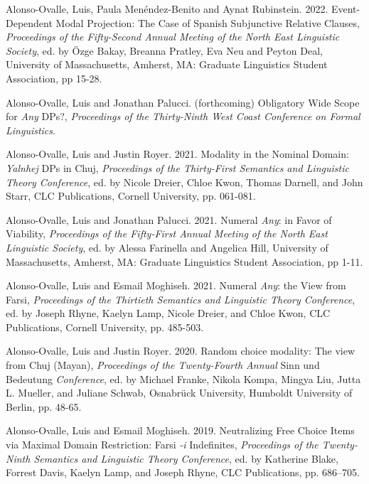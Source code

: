 \documentclass[11pt]{article}
\begin{document}
Alonso-Ovalle, Luis, Paula Men\'endez-Benito and Aynat Rubinstein. 2022. Event-Dependent Modal Projection: The Case of Spanish Subjunctive Relative Clauses, \textit{Proceedings of the Fifty-Second Annual Meeting of the North East Linguistic Society}, ed. by \"{O}zge Bakay, Breanna Pratley, Eva Neu and Peyton Deal, University of Massachusetts, Amherst, MA: Graduate Linguistics Student Association, pp 15-28.

Alonso-Ovalle, Luis and Jonathan Palucci. (forthcoming) Obligatory Wide Scope for \textit{Any} DPs?, \textit{Proceedings of the Thirty-Ninth West Coast Conference on Formal Linguistics}.

Alonso-Ovalle, Luis and Justin Royer. 2021. Modality in the Nominal Domain: \textit{Yalnhej} DPs in Chuj, \textit{Proceedings of the Thirty-First Semantics and Linguistic Theory Conference}, ed. by Nicole Dreier, Chloe Kwon, Thomas Darnell, and John Starr, CLC Publications, Cornell University, pp. 061-081.

Alonso-Ovalle, Luis and Jonathan Palucci. 2021. Numeral \textit{Any}: in Favor of Viability, \textit{Proceedings of the Fifty-First Annual Meeting of the North East Linguistic Society}, ed. by Alessa Farinella and Angelica Hill, University of Massachusetts, Amherst, MA: Graduate Linguistics Student Association, pp 1-11.

 Alonso-Ovalle, Luis and Esmail Moghiseh. 2021. Numeral \textit{Any}: the View from Farsi, \textit{Proceedings of the Thirtieth Semantics and Linguistic Theory Conference}, ed. by Joseph Rhyne, Kaelyn Lamp, Nicole Dreier, and Chloe Kwon, CLC Publications, Cornell University, pp. 485-503. %
      
    Alonso-Ovalle, Luis and Justin Royer. 2020. Random choice modality: The view from Chuj (Mayan), \textit{Proceedings of the Twenty-Fourth Annual} Sinn und Bedeutung \textit{Conference}, ed. by Michael Franke, Nikola Kompa, Mingya Liu, Jutta L. Mueller, and Juliane Schwab, Osnabr\"{u}ck University, Humboldt University of Berlin, pp. 48-65. 
    
      Alonso-Ovalle, Luis and Esmail Moghiseh. 2019. Neutralizing Free Choice Items via Maximal Domain
Restriction: Farsi \textit{-i} Indefinites, \textit{Proceedings of the Twenty-Ninth Semantics and Linguistic Theory Conference}, ed. by Katherine Blake, Forrest Davis, Kaelyn Lamp, and Joseph Rhyne, CLC Publications, pp. 686–705. 
      
\end{document}
